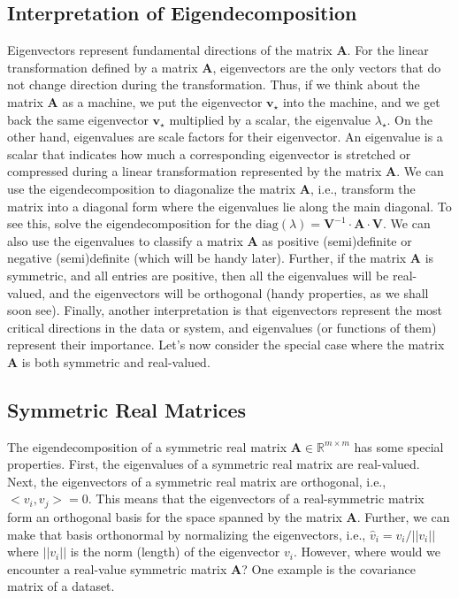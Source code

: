 \documentclass{article}[11pt]
\newcommand{\norm}[1]{\left|\left|#1\right|\right|}
\begin{document}
\subsection{Interpretation of Eigendecomposition}
Eigenvectors represent fundamental directions of the matrix $\mathbf{A}$. For the linear transformation defined by a matrix $\mathbf{A}$, eigenvectors are the only vectors that do not change direction during the transformation. 
Thus, if we think about the matrix $\mathbf{A}$ as a machine, we put the eigenvector $\mathbf{v}_{\star}$ into the machine, and we get back the same eigenvector $\mathbf{v}_{\star}$ multiplied by a scalar, the eigenvalue $\lambda_{\star}$.
On the other hand, eigenvalues are scale factors for their eigenvector. An eigenvalue is a scalar that indicates how much a corresponding eigenvector is stretched or compressed during a linear transformation represented by the matrix $\mathbf{A}$.
We can use the eigendecomposition to diagonalize the matrix $\mathbf{A}$, i.e., transform the matrix into a diagonal form where the eigenvalues lie along the main diagonal. To see this, solve the eigendecomposition for the $\text{diag}(\lambda) = \mathbf{V}^{-1}\cdot\mathbf{A}\cdot\mathbf{V}$. 
We can also use the eigenvalues to classify a matrix $\mathbf{A}$ as positive (semi)definite or negative (semi)definite (which will be handy later). 
Further, if the matrix $\mathbf{A}$ is symmetric, and all entries are positive, then all the eigenvalues will be real-valued, and the eigenvectors will be orthogonal (handy properties, as we shall soon see).
Finally, another interpretation is that eigenvectors represent the most critical directions in the data or system, and eigenvalues (or functions of them) represent their importance. 
Let's now consider the special case where the matrix $\mathbf{A}$ is both symmetric and real-valued.

\subsection{Symmetric Real Matrices}
The eigendecomposition of a symmetric real matrix $\mathbf{A}\in\mathbb{R}^{m\times{m}}$ has some special properties.
First, the eigenvalues of a symmetric real matrix are real-valued. Next, the eigenvectors of a symmetric real matrix are orthogonal, i.e., $<v_{i},v_{j}> = 0$. 
This means that the eigenvectors of a real-symmetric matrix form an orthogonal basis for the space spanned by the matrix $\mathbf{A}$.
Further, we can make that basis orthonormal by normalizing the eigenvectors, i.e., $\hat{v}_{i} = v_{i}/\norm{v_{i}}$ where $\norm{v_{i}}$ is the norm (length) of the eigenvector $v_{i}$.
However, where would we encounter a real-value symmetric matrix $\mathbf{A}$? One example is the covariance matrix of a dataset.
\end{document}
